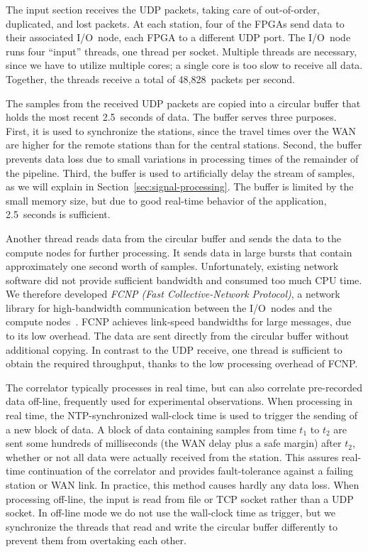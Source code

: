 \documentclass{sig-alternate}
\begin{document}
The input section receives the UDP packets, taking care of out-of-order,
duplicated, and lost packets.
At each station, four of the FPGAs send data to their associated I/O~node,
each FPGA to a different UDP port.
The I/O~node runs four ``input'' threads, one thread per socket.
Multiple threads are necessary, since we have to utilize multiple cores; a single core is too slow to receive all
data.
Together, the threads receive a total of 48,828~packets per second.

The samples from the received UDP packets are copied into a circular buffer that
holds the most recent 2.5~seconds of data.
The buffer serves three purposes.
First, it is used to synchronize the stations, since the travel times over
the WAN are higher for the remote stations than for the central stations.
Second, the buffer prevents data loss due to small variations in processing
times of the remainder of the pipeline.
Third, the buffer is used to artificially delay the stream of samples,
as we will explain in Section~\ref{sec:signal-processing}.
The buffer is limited by the small memory size, but due to good real-time
behavior of the application, 2.5~seconds is sufficient.

Another thread reads data from the circular buffer and sends the data to
the compute nodes for further processing. 
It sends data in large bursts that contain approximately one second worth of samples.
Unfortunately, existing network software did not provide sufficient bandwidth
and consumed too much CPU time.
We therefore developed \emph{FCNP (Fast Collective-Network Protocol)}, a 
network library for high-bandwidth communication between the I/O~nodes and the
compute nodes~\cite{Romein:09a}.
FCNP achieves link-speed bandwidths for large messages, due to
its low overhead.
The data are sent directly from the circular buffer without additional copying.
In contrast to the UDP receive, one thread is sufficient to obtain the
required throughput, thanks to the low processing overhead of FCNP.

The correlator typically processes in real time, but can also correlate
pre-recorded data off-line, frequently used for experimental observations.
When processing in real time, the NTP-synchronized wall-clock time
is used to trigger the sending of a new block of data.
A block of data containing samples from time $t_1$ to $t_2$ are sent some 
hundreds of milliseconds (the WAN delay plus a safe margin) after $t_2$,
whether or not all data were actually received from the station.
This assures real-time continuation of the correlator and
provides fault-tolerance against a failing station or WAN link.
In practice, this method causes hardly any data loss.
When processing off-line, the input is read from file or TCP socket rather
than a UDP socket.
In off-line mode we do not use the wall-clock time as
trigger, but we synchronize the threads that read and write the circular
buffer differently to prevent them from overtaking each other.
\end{document}
